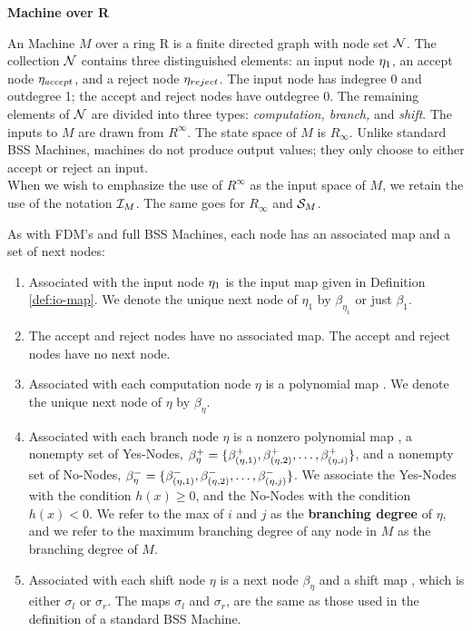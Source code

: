 \begin{definition} \textbf{\ndet Machine over R}

  An \ndet Machine $M$ over a ring R is a finite directed graph with
  node set $\mathcal{N}$.  The collection $\mathcal{N}$ contains three
  distinguished elements: an input node $\eta_{1}$, an accept node
  $\eta_{accept}$, and a reject node $\eta_{reject}$.  The input node has indegree
  0 and outdegree 1; the accept and reject nodes have outdegree 0.
  The remaining elements of $\mathcal{N}$ are divided into three types:
  \emph{computation, branch,} and \emph{shift}. The inputs to $M$ are
  drawn from $R^\infty$.  The state space of $M$ is $R_\infty$. Unlike
  standard BSS Machines, \ndet machines do not produce output values;
  they only choose to either accept or reject
  an input.\\

  When we wish to emphasize the use of $R^\infty$ as the input space
  of $M$, we retain the use of the notation $\mathcal{I}_M$. The same
  goes for $R_\infty$ and $\mathcal{S}_M$.

  As with FDM's and full BSS Machines, each node has an associated map
  and a set of next nodes:

  \begin{enumerate}
  \item Associated with the input node $\eta_{1}$ is the input map
     given in Definition
    \ref{def:io-map}. We denote the unique next node of $\eta_1$ by
    $\beta_{\eta_1}$ or just $\beta_1$.

  \item The accept and reject nodes have no associated map. The accept
    and reject nodes have no next node.

  \item Associated with each computation node $\eta$ is a polynomial
    map . We denote the
    unique next node of $\eta$ by $\beta_\eta$.
    
  \item Associated with each branch node $\eta$ is a nonzero
    polynomial map , a
    nonempty set of Yes-Nodes, $\beta^+_\eta = \{\beta_{(\eta, 1)}^+,
      \beta_{(\eta, 2)}^+, \ldots, \beta_{(\eta, i)}^+\}$, and a nonempty set of
    No-Nodes, $\beta_\eta^- = \{\beta_{(\eta, 1)}^-, \beta_{(\eta, 2)}^-, \ldots,
      \beta_{(\eta, j)}^-\}$.  We associate the Yes-Nodes with the condition
    $h(x) \geq 0$, and the No-Nodes with the condition $h(x) < 0$. We
    refer to the max of $i$ and $j$ as the \textbf{branching degree}
    of $\eta$, and we refer to the maximum branching degree of any
    node in $M$ as the branching degree of $M$.

  \item Associated with each shift node $\eta$ is a next node
    $\beta_\eta$ and a shift map
    , which is either
    $\sigma_l$ or $\sigma_r$. The maps $\sigma_l$ and $\sigma_r$, are
    the same as those used in the definition of a standard BSS
    Machine.

  \end{enumerate}
\end{definition}

